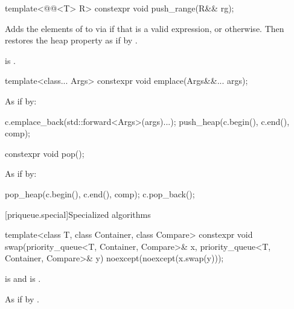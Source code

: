 %
\begin{itemdecl}
template<@@<T> R>
  constexpr void push_range(R&& rg);
\end{itemdecl}

\begin{itemdescr}
\pnum
\effects
Adds the elements of  to 
via  if that is a valid expression,
or  otherwise.
Then restores the heap property as if by
.

\pnum
\ensures
{} is .
\end{itemdescr}

%
\begin{itemdecl}
template<class... Args> constexpr void emplace(Args&&... args);
\end{itemdecl}

\begin{itemdescr}
\pnum
\effects
As if by:
\begin{codeblock}
c.emplace_back(std::forward<Args>(args)...);
push_heap(c.begin(), c.end(), comp);
\end{codeblock}
\end{itemdescr}

%
\begin{itemdecl}
constexpr void pop();
\end{itemdecl}

\begin{itemdescr}
\pnum
\effects
As if by:
\begin{codeblock}
pop_heap(c.begin(), c.end(), comp);
c.pop_back();
\end{codeblock}
\end{itemdescr}

[priqueue.special]{Specialized algorithms}

%
\begin{itemdecl}
template<class T, class Container, class Compare>
  constexpr void swap(priority_queue<T, Container, Compare>& x,
                      priority_queue<T, Container, Compare>& y) noexcept(noexcept(x.swap(y)));
\end{itemdecl}

\begin{itemdescr}
\pnum
\constraints
{} is  and
 is .

\pnum
\effects
As if by .
\end{itemdescr}

